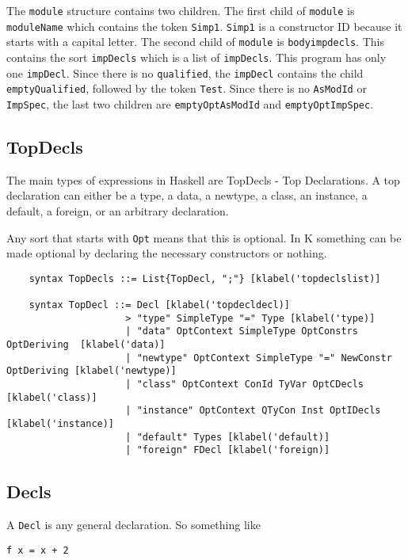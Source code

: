 The \texttt{module} structure contains two children. The first child of \texttt{module} is \texttt{moduleName} which contains the token \texttt{Simp1}. \texttt{Simp1} is a constructor ID because it starts with a capital letter. The second child of \texttt{module} is \texttt{bodyimpdecls}. This contains the sort \texttt{impDecls} which is a list of \texttt{impDecls}. This program has only one \texttt{impDecl}. Since there is no \texttt{qualified}, the \texttt{impDecl} contains the child \texttt{emptyQualified}, followed by the token \texttt{Test}. Since there is no \texttt{AsModId} or \texttt{ImpSpec}, the last two children are \texttt{emptyOptAsModId} and \texttt{emptyOptImpSpec}.

\subsection{TopDecls}
The main types of expressions in Haskell are TopDecls - Top Declarations. A top declaration can either be a type, a data, a newtype, a class, an instance, a default, a foreign, or an arbitrary declaration.

Any sort that starts with \texttt{Opt} means that this is optional. In K something can be made optional by declaring the necessary constructors or nothing.

\begin{lstlisting}
    syntax TopDecls ::= List{TopDecl, ";"} [klabel('topdeclslist)]

    syntax TopDecl ::= Decl [klabel('topdecldecl)]
                     > "type" SimpleType "=" Type [klabel('type)]
                     | "data" OptContext SimpleType OptConstrs OptDeriving  [klabel('data)]
                     | "newtype" OptContext SimpleType "=" NewConstr OptDeriving [klabel('newtype)]
                     | "class" OptContext ConId TyVar OptCDecls [klabel('class)]
                     | "instance" OptContext QTyCon Inst OptIDecls [klabel('instance)]
                     | "default" Types [klabel('default)]
                     | "foreign" FDecl [klabel('foreign)]
\end{lstlisting}

\subsection{Decls}

A \texttt{Decl} is any general declaration. So something like

\begin{lstlisting}
f x = x + 2
\end{lstlisting}

